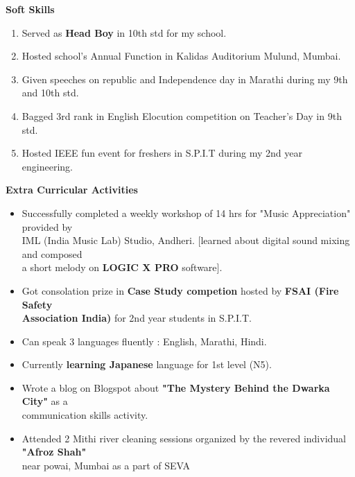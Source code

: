 \documentclass[12pt]{article}
\begin{document}
\begin{flushleft}
\begin{itemize}
\begin{enumerate}
	\end{enumerate}  
	\vspace{10mm}
\end{itemize}

\textbf{Soft Skills}
\begin{enumerate}
	\item Served as \textbf{Head Boy} in 10th std for my school. 
	\item Hosted school's Annual Function in Kalidas Auditorium Mulund, Mumbai. 
	\item Given speeches on republic and Independence day in Marathi during my 9th and 10th std.
	\item Bagged 3rd rank in English Elocution competition on Teacher's Day in 9th std.
	\item Hosted IEEE fun event for freshers in S.P.I.T during my 2nd year engineering. 
\end{enumerate}

\vspace{10mm}
\textbf{Extra Curricular Activities}
\begin{itemize}
	\item Successfully completed a weekly workshop of 14 hrs for "Music Appreciation" provided by\\ IML (India Music Lab) Studio, Andheri. [learned about digital sound mixing and composed \\ a short melody on \textbf{LOGIC X PRO} software].
	\item Got consolation prize in \textbf{Case Study competion} hosted by \textbf{FSAI (Fire Safety \\ Association India)} for 2nd year students in S.P.I.T.
	\item Can speak 3 languages fluently : English, Marathi, Hindi.
	\item Currently \textbf{learning Japanese} language for 1st level (N5).
	\item Wrote a blog on Blogspot about \textbf{"The Mystery Behind the Dwarka City"} as a \\communication skills activity.
	\item Attended 2 Mithi river cleaning sessions organized by the revered individual \textbf{"Afroz Shah"} \\near powai, Mumbai as a part of SEVA
\end{itemize}


\end{flushleft}
\end{document}
